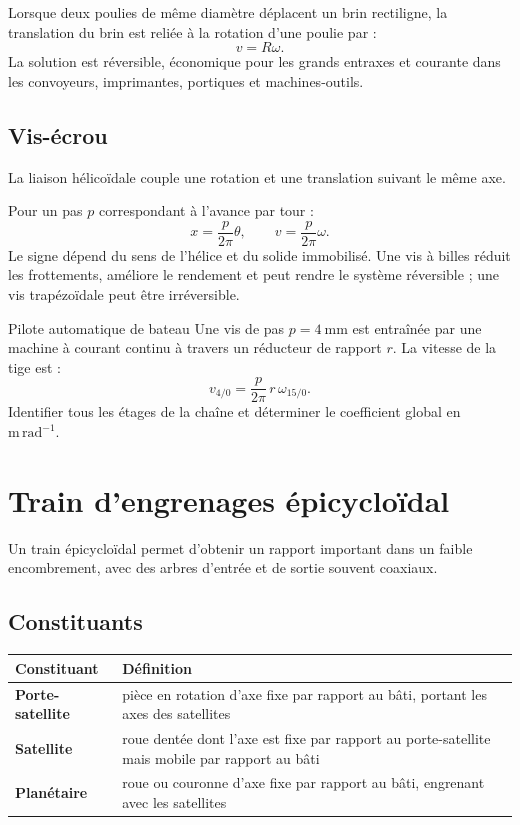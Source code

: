 Lorsque deux poulies de même diamètre déplacent un brin rectiligne, la
translation du brin est reliée à la rotation d'une poulie par :
\[
\boxed{v=R\omega.}
\]
La solution est réversible, économique pour les grands entraxes et
courante dans les convoyeurs, imprimantes, portiques et machines-outils.

\subsection{Vis-écrou}

La liaison hélicoïdale couple une rotation et une translation suivant le
même axe.

\begin{center}\TLVisEcrou\end{center}

Pour un pas $p$ correspondant à l'avance par tour :
\[
\boxed{x=\frac{p}{2\pi}\theta,}
\qquad
\boxed{v=\frac{p}{2\pi}\omega.}
\]
Le signe dépend du sens de l'hélice et du solide immobilisé. Une vis à
billes réduit les frottements, améliore le rendement et peut rendre le
système réversible ; une vis trapézoïdale peut être irréversible.

\begin{TLThreeApp}{Pilote automatique de bateau}
Une vis de pas $p=4\ \mathrm{mm}$ est entraînée par une machine à courant
continu à travers un réducteur de rapport $r$. La vitesse de la tige est :
\[
v_{4/0}=\frac{p}{2\pi}\,r\,\omega_{15/0}.
\]
Identifier tous les étages de la chaîne et déterminer le coefficient
global en $\mathrm{m\,rad^{-1}}$.
\end{TLThreeApp}

\section{Train d'engrenages épicycloïdal}
\label{sec:trans-epi}

Un train épicycloïdal permet d'obtenir un rapport important dans un
faible encombrement, avec des arbres d'entrée et de sortie souvent
coaxiaux.

\begin{center}\TLTrainEpicycloidal\end{center}

\subsection{Constituants}

\begin{center}
\small
\begin{tabularx}{\linewidth}{>{\bfseries}p{3cm}X}
\toprule
Constituant & Définition \\
\midrule
Porte-satellite & pièce en rotation d'axe fixe par rapport au bâti, portant les axes des satellites \\
Satellite & roue dentée dont l'axe est fixe par rapport au porte-satellite mais mobile par rapport au bâti \\
Planétaire & roue ou couronne d'axe fixe par rapport au bâti, engrenant avec les satellites \\
\bottomrule
\end{tabularx}
\end{center}

